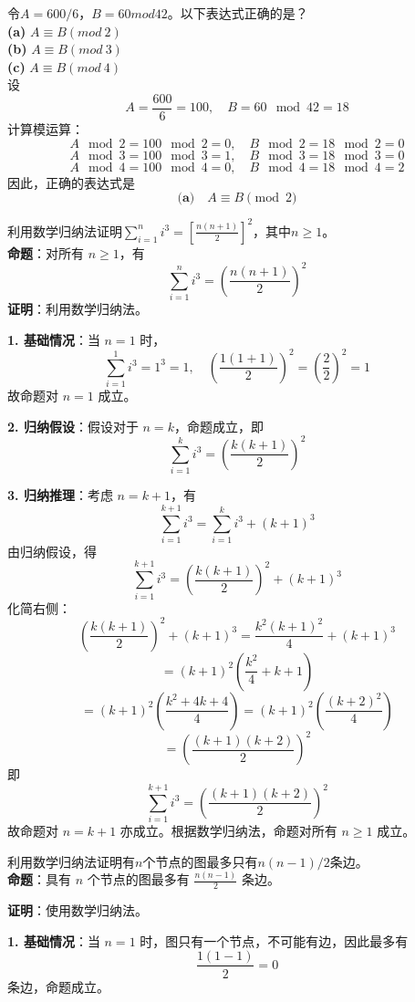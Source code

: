 \documentclass[12pt,twoside]{article}
\begin{document}
\begin{problems}
\newpage
\problem  %
令$A=600/6$，$B=60 mod 42$。以下表达式正确的是？\\
\textbf{(a)} $A\equiv B (mod~2)$\\
\textbf{(b)} $A\equiv B (mod~3)$\\
\textbf{(c)} $A\equiv B (mod~4)$\\
设  
\[
A = \frac{600}{6} = 100, \quad B = 60 \mod 42 = 18
\]  
计算模运算：  
\[
A \mod 2 = 100 \mod 2 = 0, \quad B \mod 2 = 18\mod 2 = 0
\]  
\[
A \mod 3 = 100\mod 3 = 1, \quad B\mod 3 = 18\mod 3 = 0
\]  
\[
A \mod 4 = 100\mod 4 = 0, \quad B\mod 4 = 18\mod 4 = 2
\]  
因此，正确的表达式是  
\[
\textbf{(a)} \quad A\equiv B \pmod{2}
\]  


\newpage
\problem  %
利用数学归纳法证明$\sum_{i=1}^ni^3 = \left [\frac{n(n+1)}{2}\right]^2$，其中$n\geq 1$。\\



\textbf{命题}：对所有 $n \geq 1$，有  
\[
\sum_{i=1}^n i^3 = \left( \frac{n(n+1)}{2} \right)^2
\]  
\textbf{证明}：利用数学归纳法。  

\textbf{1. 基础情况}：当 $n=1$ 时，  
\[
\sum_{i=1}^1 i^3 = 1^3 = 1, \quad \left( \frac{1(1+1)}{2} \right)^2 = \left( \frac{2}{2} \right)^2 = 1
\]  
故命题对 $n=1$ 成立。  

\textbf{2. 归纳假设}：假设对于 $n=k$，命题成立，即  
\[
\sum_{i=1}^k i^3 = \left( \frac{k(k+1)}{2} \right)^2
\]  

\textbf{3. 归纳推理}：考虑 $n=k+1$，有  
\[
\sum_{i=1}^{k+1} i^3 = \sum_{i=1}^{k} i^3 + (k+1)^3
\]  
由归纳假设，得  
\[
\sum_{i=1}^{k+1} i^3 = \left( \frac{k(k+1)}{2} \right)^2 + (k+1)^3
\]  
化简右侧：  
\[
\left( \frac{k(k+1)}{2} \right)^2 + (k+1)^3 = \frac{k^2(k+1)^2}{4} + (k+1)^3
\]  
\[
= (k+1)^2 \left( \frac{k^2}{4} + k+1 \right)
\]  
\[
= (k+1)^2 \left( \frac{k^2 + 4k + 4}{4} \right) = (k+1)^2 \left( \frac{(k+2)^2}{4} \right)
\]  
\[
= \left( \frac{(k+1)(k+2)}{2} \right)^2
\]  
即  
\[
\sum_{i=1}^{k+1} i^3 = \left( \frac{(k+1)(k+2)}{2} \right)^2
\]  
故命题对 $n=k+1$ 亦成立。根据数学归纳法，命题对所有 $n \geq 1$ 成立。 


\newpage
\problem  %
利用数学归纳法证明有$n$个节点的图最多只有$n(n-1)/2$条边。\\
\textbf{命题}：具有 $n$ 个节点的图最多有 $\frac{n(n-1)}{2}$ 条边。  

\textbf{证明}：使用数学归纳法。  

\textbf{1. 基础情况}：当 $n=1$ 时，图只有一个节点，不可能有边，因此最多有  
\[
\frac{1(1-1)}{2} = 0
\]  
条边，命题成立。  


\end{problems}
\end{document}
